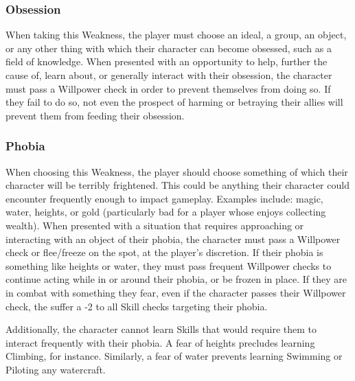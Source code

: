 \documentclass[oneside]{book}
\newcommand{\comment}[1]{}
\begin{document}
\begin{multicols}{2}
\subsubsection{Obsession}
When taking this Weakness, the player must choose an ideal, a group, an object, or any other thing with which their character can become obsessed, such as a field of knowledge. When presented with an opportunity to help, further the cause of, learn about, or generally interact with their obsession, the character must pass a Willpower check in order to prevent themselves from doing so. If they fail to do so, not even the prospect of harming or betraying their allies will prevent them from feeding their obsession. 
\subsubsection{Phobia}
When choosing this Weakness, the player should choose something of which their character will be terribly frightened. This could be anything their character could encounter frequently enough to impact gameplay. Examples include: magic, water, heights, or gold (particularly bad for a player whose enjoys collecting wealth). When presented with a situation that requires approaching or interacting with an object of their phobia, the character must pass a Willpower check or flee/freeze on the spot, at the player's discretion. If their phobia is something like heights or water, they must pass frequent Willpower checks to continue acting while in or around their phobia, or be frozen in place. If they are in combat with something they fear, even if the character passes their Willpower check, the suffer a -2 to all Skill checks targeting their phobia.

Additionally, the character cannot learn Skills that would require them to interact frequently with their phobia. A fear of heights precludes learning Climbing, for instance. Similarly, a fear of water prevents learning Swimming or Piloting any watercraft.
\comment{ 
\subsubsection{Shifty}
The character lacks certain social cues or acts in a manner that lends them an air of deceit. This could be the result of a poor childhood, past trauma, or years spent shut in a library with only tomes for company. On any Persuasion, Fast Talk, or Seduce checks, the character's level of Success is being treated as one lower (a Green Success is still a Green Success, however). 
}

\end{multicols}
\end{document}
